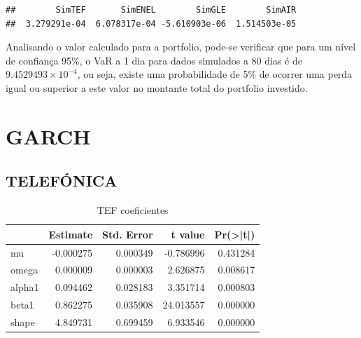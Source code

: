 \documentclass[
  12pt,
  a4paper,
  openany]{book}
\newenvironment{Shaded}{\begin{snugshade}}{\end{snugshade}}
\newcommand{\DataTypeTok}[1]{\textcolor[rgb]{0.13,0.29,0.53}{#1}}
\newcommand{\DecValTok}[1]{\textcolor[rgb]{0.00,0.00,0.81}{#1}}
\newcommand{\FloatTok}[1]{\textcolor[rgb]{0.00,0.00,0.81}{#1}}
\newcommand{\KeywordTok}[1]{\textcolor[rgb]{0.13,0.29,0.53}{\textbf{#1}}}
\newcommand{\NormalTok}[1]{#1}
\newcommand{\OperatorTok}[1]{\textcolor[rgb]{0.81,0.36,0.00}{\textbf{#1}}}
\newcommand{\StringTok}[1]{\textcolor[rgb]{0.31,0.60,0.02}{#1}}
\begin{document}
\scriptsize

\begin{Shaded}
\end{Shaded}

\begin{verbatim}
##        SimTEF       SimENEL        SimGLE        SimAIR 
##  3.279291e-04  6.078317e-04 -5.610903e-06  1.514503e-05
\end{verbatim}

\normalsize

Analisando o valor calculado para a portfolio, pode-se verificar que para um nível de confiança 95\%, o VaR a 1 dia para dados simulados a 80 dias é de \ensuremath{9.4529493\times 10^{-4}}, ou seja, existe uma probabilidade de 5\% de ocorrer uma perda igual ou superior a este valor no montante total do portfolio investido.

\hypertarget{garch}{%
\section{GARCH}\label{garch}}

\hypertarget{telefuxf3nica}{%
\subsection{TELEFÓNICA}\label{telefuxf3nica}}

\begin{table}[!h]

\caption{\label{tab:unnamed-chunk-18}TEF coeficientes}
\centering
\begin{tabular}[t]{lrrrr}
\toprule
  &  Estimate &  Std. Error &  t value & Pr(>|t|)\\
\midrule
mu & -0.000275 & 0.000349 & -0.786996 & 0.431284\\
omega & 0.000009 & 0.000003 & 2.626875 & 0.008617\\
alpha1 & 0.094462 & 0.028183 & 3.351714 & 0.000803\\
beta1 & 0.862275 & 0.035908 & 24.013557 & 0.000000\\
shape & 4.849731 & 0.699459 & 6.933546 & 0.000000\\
\bottomrule
\end{tabular}
\end{table}
\FloatBarrier
\centering
\end{document}
